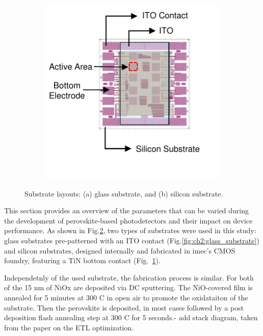 \begin{figure}[htbp]
\begin{subfigure}[t]{0.49\textwidth}
        \includegraphics[width=\textwidth]{chapters/material_properties/images/PIX_Substrate.pdf} %
        \caption{}
        \label{fig:ch2:pix_substrate}
    \end{subfigure}

    \caption{Substrate layouts: (a) glass substrate, and (b) silicon substrate.}
    \label{fig:ch2:types_of_substrates}
\end{figure}


This section provides an overview of the parameters that can be varied during the development of perovskite-based photodetectors and their impact on device performance. As shown in Fig.\ref{fig:ch2:types_of_substrates}, two types of substrates were used in this study: glass substrates pre-patterned with an ITO contact (Fig.\ref{fig:ch2:glass_substrate}) and silicon substrates, designed internally and fabricated in imec's CMOS foundry, featuring a TiN bottom contact (Fig.~\ref{fig:ch2:pix_substrate}).

Independetnly of the used substrate, the fabrication process is similar. For both of the 15 nm of NiOx are deposited via DC sputtering. The NiO-covered film is annealed for 5 minutes at 300 C in open air to promote the oxidataiton of the substrate. Then the perovskite is deposited, in most cases followed by a post deposition flash annealing step at 300 C for 5 seconds.- add stack diagram, taken from the paper on the ETL optimization.

